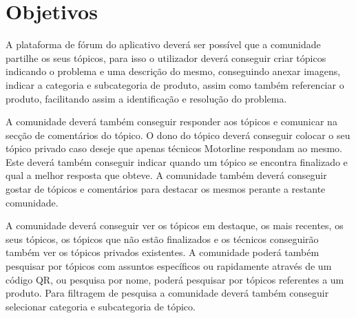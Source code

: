  

 
 


\newpage

\section{Objetivos}
A plataforma de fórum do aplicativo deverá ser possível que a comunidade partilhe os seus tópicos, para 
isso o utilizador deverá conseguir criar tópicos indicando o problema e uma descrição do mesmo, 
conseguindo anexar imagens, indicar a categoria e subcategoria de produto, assim como também referenciar 
o produto, facilitando assim a identificação e resolução do problema.

A comunidade deverá também conseguir responder aos tópicos e comunicar na secção de comentários do tópico. 
O dono do tópico deverá conseguir colocar o seu tópico privado caso deseje que apenas técnicos Motorline 
respondam ao mesmo. Este deverá também conseguir indicar quando um tópico se encontra finalizado e qual a 
melhor resposta que obteve. A comunidade também deverá conseguir gostar de tópicos e comentários para 
destacar os mesmos perante a restante comunidade.

A comunidade deverá conseguir ver os tópicos em destaque, os mais recentes, os seus tópicos, os tópicos 
que não estão finalizados e os técnicos conseguirão também ver os tópicos privados existentes. 
A comunidade poderá também pesquisar por tópicos com assuntos específicos ou rapidamente através de 
um código QR, ou pesquisa por nome, poderá pesquisar por tópicos referentes a um produto. Para filtragem 
de pesquisa a comunidade deverá também conseguir selecionar categoria e subcategoria de tópico.

